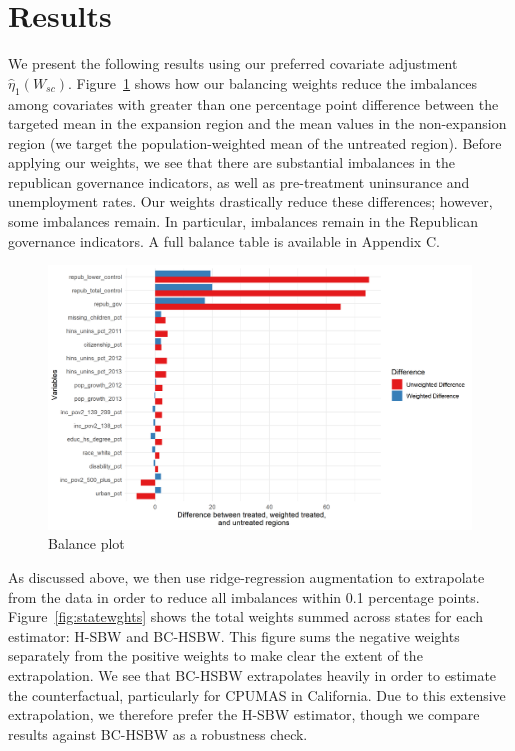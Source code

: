 \documentclass[12pt]{article}
\begin{document}
\section{Results}

We present the following results using our preferred covariate adjustment $\hat{\eta}_1(W_{sc})$.  Figure~\ref{fig:loveplot} shows how our balancing weights reduce the imbalances among covariates with greater than one percentage point difference between the targeted mean in the expansion region and the mean values in the non-expansion region (we target the population-weighted mean of the untreated region). Before applying our weights, we see that there are substantial imbalances in the republican governance indicators, as well as pre-treatment uninsurance and unemployment rates. Our weights drastically reduce these differences; however, some imbalances remain. In particular, imbalances remain in the Republican governance indicators. A full balance table is available in Appendix C. 

\begin{figure}[B]
\begin{center}
    \includegraphics[scale=0.6]{01_Plots/balance-plot-etu.png}
    \caption{Balance plot}
    \label{fig:loveplot}
\end{center}
\end{figure}

As discussed above, we then use ridge-regression augmentation to extrapolate from the data in order to reduce all imbalances within 0.1 percentage points. Figure~\ref{fig:statewghts} shows the total weights summed across states for each estimator: H-SBW and BC-HSBW. This figure sums the negative weights separately from the positive weights to make clear the extent of the extrapolation. We see that BC-HSBW extrapolates heavily in order to estimate the counterfactual, particularly for CPUMAS in California. Due to this extensive extrapolation, we therefore prefer the H-SBW estimator, though we compare results against BC-HSBW as a robustness check.
\end{document}
